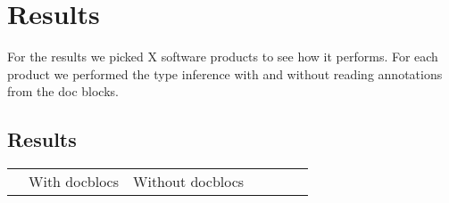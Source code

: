 \documentclass[main.tex]{subfiles}
\begin{document}
    \chapter{Results}\label{ch:results}
    For the results we picked X software products to see how it performs.
    For each product we performed the type inference with and without reading annotations from the doc blocks.
    
    \section{Results}
\npaddmissingzero
\npfourdigitsep
\begin{table}[H]
	\centering
	\scriptsize
	\begin{tabular}{@{}lrrrrrrrrrrrr@{}} 
		\toprule    	
    		&  
    		\multicolumn{4}{c}{With docblocs} &
    		\multicolumn{4}{c}{Without docblocs} \\ 
    		

\end{tabular}
\end{table}
\end{document}
